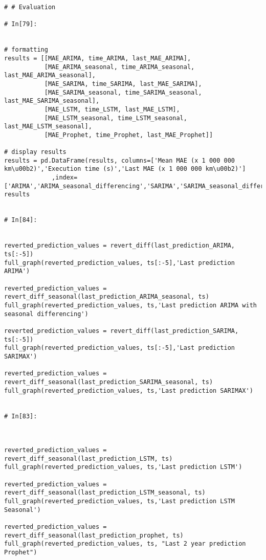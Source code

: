 \begin{verbatim}
# # Evaluation

# In[79]:


# formatting
results = [[MAE_ARIMA, time_ARIMA, last_MAE_ARIMA],
           [MAE_ARIMA_seasonal, time_ARIMA_seasonal, last_MAE_ARIMA_seasonal],
           [MAE_SARIMA, time_SARIMA, last_MAE_SARIMA],
           [MAE_SARIMA_seasonal, time_SARIMA_seasonal, last_MAE_SARIMA_seasonal],
           [MAE_LSTM, time_LSTM, last_MAE_LSTM],
           [MAE_LSTM_seasonal, time_LSTM_seasonal, last_MAE_LSTM_seasonal],
           [MAE_Prophet, time_Prophet, last_MAE_Prophet]]

# display results
results = pd.DataFrame(results, columns=['Mean MAE (x 1 000 000 km\u00b2)','Execution time (s)','Last MAE (x 1 000 000 km\u00b2)']
             ,index=['ARIMA','ARIMA_seasonal_differencing','SARIMA','SARIMA_seasonal_differncing','LSTM','LSTM_seasonal_differencing','Prophet']).round(decimals=3)
results


# In[84]:


reverted_prediction_values = revert_diff(last_prediction_ARIMA, ts[:-5])
full_graph(reverted_prediction_values, ts[:-5],'Last prediction ARIMA')

reverted_prediction_values = revert_diff_seasonal(last_prediction_ARIMA_seasonal, ts)
full_graph(reverted_prediction_values, ts,'Last prediction ARIMA with seasonal differencing')

reverted_prediction_values = revert_diff(last_prediction_SARIMA, ts[:-5])
full_graph(reverted_prediction_values, ts[:-5],'Last prediction SARIMAX')

reverted_prediction_values = revert_diff_seasonal(last_prediction_SARIMA_seasonal, ts)
full_graph(reverted_prediction_values, ts,'Last prediction SARIMAX')


# In[83]:



reverted_prediction_values = revert_diff_seasonal(last_prediction_LSTM, ts)
full_graph(reverted_prediction_values, ts,'Last prediction LSTM')

reverted_prediction_values = revert_diff_seasonal(last_prediction_LSTM_seasonal, ts)
full_graph(reverted_prediction_values, ts,'Last prediction LSTM Seasonal')

reverted_prediction_values = revert_diff_seasonal(last_prediction_prophet, ts)
full_graph(reverted_prediction_values, ts, "Last 2 year prediction Prophet")



\end{verbatim}

